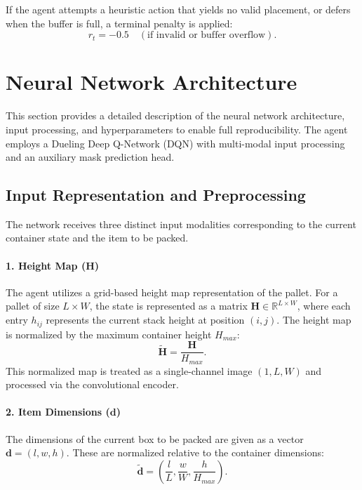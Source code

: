 \documentclass[runningheads]{llncs}
\begin{document}
If the agent attempts a heuristic action that yields no valid placement, or defers when the buffer is full, a terminal penalty is applied:
\begin{equation}
    r_t = -0.5 \quad (\text{if invalid or buffer overflow}).
\end{equation}

\section{Neural Network Architecture}

This section provides a detailed description of the neural network architecture, input processing, and hyperparameters to enable full reproducibility. The agent employs a Dueling Deep Q-Network (DQN) with multi-modal input processing and an auxiliary mask prediction head.

\subsection{Input Representation and Preprocessing}
The network receives three distinct input modalities corresponding to the current container state and the item to be packed.

\paragraph{1. Height Map ($\mathbf{H}$)}
The agent utilizes a grid-based height map representation of the pallet. For a pallet of size $L \times W$, the state is represented as a matrix $\mathbf{H} \in \mathbb{R}^{L \times W}$, where each entry $h_{ij}$ represents the current stack height at position $(i, j)$. The height map is normalized by the maximum container height $H_{max}$:
\begin{equation}
    \tilde{\mathbf{H}} = \frac{\mathbf{H}}{H_{max}}.
\end{equation}
This normalized map is treated as a single-channel image $(1, L, W)$ and processed via the convolutional encoder.

\paragraph{2. Item Dimensions ($\mathbf{d}$)}
The dimensions of the current box to be packed are given as a vector $\mathbf{d} = (l, w, h)$. These are normalized relative to the container dimensions:
\begin{equation}
    \tilde{\mathbf{d}} = \left( \frac{l}{L}, \frac{w}{W}, \frac{h}{H_{max}} \right).
\end{equation}
\end{document}
